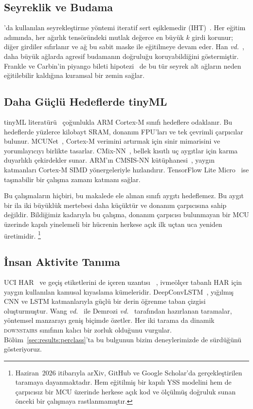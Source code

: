 \subsection{Seyreklik ve Budama}

\fastgrnn{}'da kullanılan seyrekleştirme yöntemi iteratif sert
eşiklemedir (IHT)~\cite{blumensath2009iht}. Her eğitim adımında,
her ağırlık tensöründeki mutlak değerce en büyük $k$ girdi korunur;
diğer girdiler sıfırlanır ve ağ bu sabit maske ile eğitilmeye devam
eder. Han \emph{vd.}~\cite{han2015pruning}, daha büyük ağlarda
agresif budamanın doğruluğu koruyabildiğini göstermiştir. Frankle ve
Carbin'in piyango bileti hipotezi~\cite{frankle2019lt} de bu tür
seyrek alt ağların neden eğitilebilir kaldığına kuramsal bir zemin
sağlar.

\subsection{Daha Güçlü Hedeflerde tinyML}

tinyML literatürü~\cite{banbury2021mlperf} çoğunlukla ARM Cortex-M
sınıfı hedeflere odaklanır. Bu hedeflerde yüzlerce kilobayt SRAM,
donanım FPU'ları ve tek çevrimli çarpıcılar bulunur. MCUNet~\cite{lin2020mcunet},
Cortex-M verimini artırmak için sinir mimarisini ve yorumlayıcıyı
birlikte tasarlar. CMix-NN~\cite{capotondi2020cmixnn}, bellek
kısıtlı uç aygıtlar için karma duyarlıklı çekirdekler sunar.
ARM'ın CMSIS-NN kütüphanesi~\cite{lai2018cmsisnn}, yaygın katmanları
Cortex-M SIMD yönergeleriyle hızlandırır. TensorFlow Lite
Micro~\cite{david2021tflitemicro} ise taşınabilir bir çalışma
zamanı katmanı sağlar.

Bu çalışmaların hiçbiri, bu makalede ele alınan \msp{} sınıfı aygıtı
hedeflemez. Bu aygıt bir ila iki büyüklük mertebesi daha küçüktür ve
donanım çarpıcısına sahip değildir. Bildiğimiz kadarıyla bu çalışma,
donanım çarpıcısı bulunmayan bir MCU üzerinde kapılı yinelemeli bir
hücrenin herkese açık ilk uçtan uca yeniden üretimidir.%
\footnote{Haziran~2026 itibarıyla arXiv, GitHub ve Google Scholar'da
gerçekleştirilen taramaya dayanmaktadır. Hem eğitilmiş bir kapılı
YSS modelini hem de çarpıcısız bir MCU üzerinde herkese açık kod ve
ölçülmüş doğruluk sunan önceki bir çalışmaya rastlanmamıştır.}

\subsection{İnsan Aktivite Tanıma}

UCI HAR~\cite{anguita2013public} ve geçiş etiketlerini de içeren
uzantısı \hapt{}~\cite{reyes2015transition}, ivmeölçer tabanlı HAR
için yaygın kullanılan kamusal kıyaslama kümeleridir.
DeepConvLSTM~\cite{ordonez2016deepconvlstm}, yığılmış CNN ve LSTM
katmanlarıyla güçlü bir derin öğrenme taban çizgisi oluşturmuştur.
Wang \emph{vd.}~\cite{wang2019harsurvey} ile Demrozi
\emph{vd.}~\cite{demrozi2020harsurvey} tarafından hazırlanan
taramalar, yöntemsel manzarayı geniş biçimde özetler. Her iki
tarama da dinamik \textsc{downstairs} sınıfının kalıcı bir zorluk
olduğunu vurgular. Bölüm~\ref{sec:results:perclass}'ta bu bulgunun
bizim deneylerimizde de sürdüğünü gösteriyoruz.
